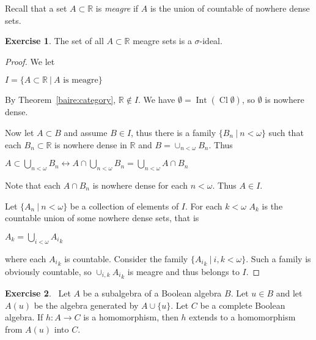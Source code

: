 \documentclass[8pt]{article}
\theoremstyle{definition}
\theoremstyle{definition}
\theoremstyle{definition}
\theoremstyle{definition}
\theoremstyle{definition}
\theoremstyle{definition}
\theoremstyle{definition}
\theoremstyle{definition}
\theoremstyle{definition}
\theoremstyle{definition}
\theoremstyle{definition}
\theoremstyle{definition}
\theoremstyle{definition}
\newtheorem{exercise}{Exercise}[section]
\theoremstyle{definition}
\theoremstyle{question}
\begin{document}
Recall that a set $A \subset \mathbb{R}$ is \emph{meagre} if $A$ is the union of countable of nowhere dense sets.

\begin{exercise}
  The set of all $A \subset \mathbb{R}$ meagre sets is a $\sigma$-ideal.
\end{exercise}

\begin{proof}
  We let 
  \begin{center}
  $I = \{ A \subset \mathbb{R} \: | \: \text{$A$ is meagre} \}$
  \end{center}

  By Theorem~\ref{baire:category}, $\mathbb{R} \notin I$. We have 
  $\emptyset = \operatorname{Int}(\operatorname{Cl}\emptyset)$, so $\emptyset$ is nowhere dense.

  Now let $A \subset B$ and assume $B \in I$, thus there is a family $\{ B_n \: | \: n < \omega \}$ such that
  each $B_n \subset \mathbb{R}$ is nowhere dense in $\mathbb{R}$ and $B = \cup_{n < \omega} B_n$.
  Thus
  \begin{center} 
  $A \subset \bigcup \limits_{n < \omega} B_n \leftrightarrow A \cap \bigcup \limits_{n < \omega} B_n = \bigcup \limits_{n < \omega} A \cap B_n$
  \end{center}

  Note that each $A \cap B_n$ is nowhere dense for each $n < \omega$. Thus $A \in I$.

  Let $\{ A_n \: | \: n < \omega \}$ be a collection of elements of $I$. For each $k < \omega$
  $A_k$ is the countable union of some nowhere dense sets, that is
  \begin{center}
    $A_k = \bigcup \limits_{i < \omega} {A_i}_{k}$
  \end{center}
  where each ${A_i}_k$ is countable.
  Consider the family $\{ {A_i}_k \: | \: i, k < \omega \}$. Such a family is obviously countable, so
  $\cup_{i, k} {A_i}_k$ is meagre and thus belongs to $I$.
\end{proof}

\begin{exercise}~\label{sikorski:lemma}
  Let $A$ be a subalgebra of a Boolean algebra $B$. Let $u \in B$ and let $A(u)$ be the algebra generated by 
  $A \cup \{ u \}$. Let $C$ be a complete Boolean algebra. If $h : A \to C$ is a homomorphism, then
  $h$ extends to a homomorphism from $A(u)$ into $C$.
\end{exercise}
\end{document}
